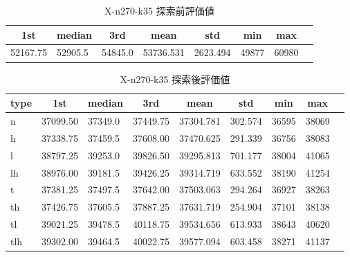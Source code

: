 \begin{table}[htbp]
    \centering
    \caption{X-n270-k35 探索前評価値}
    \begin{tabular}{|l|l|l|l|l|l|l|l|}\hline
    \multicolumn{1}{|c|}{\textbf{1st}}
    &\multicolumn{1}{c|}{\textbf{median}}
    &\multicolumn{1}{c|}{\textbf{3rd}}
    &\multicolumn{1}{c|}{\textbf{mean}}
    &\multicolumn{1}{c|}{\textbf{std}}
    &\multicolumn{1}{c|}{\textbf{min}}
    &\multicolumn{1}{c|}{\textbf{max}}\\\hline
	52167.75 & 52905.5 & 54845.0 & 53736.531 & 2623.494 & 49877 & 60980\\\hline
	\end{tabular}
\end{table}
\begin{table}[htbp]
    \centering
    \caption{X-n270-k35 探索後評価値}
    \begin{tabular}{|l|l|l|l|l|l|l|l|l|}\hline
    \multicolumn{1}{|c|}{\textbf{type}}
    &\multicolumn{1}{|c|}{\textbf{1st}}
    &\multicolumn{1}{c|}{\textbf{median}}
    &\multicolumn{1}{c|}{\textbf{3rd}}
    &\multicolumn{1}{c|}{\textbf{mean}}
    &\multicolumn{1}{c|}{\textbf{std}}
    &\multicolumn{1}{c|}{\textbf{min}}
    &\multicolumn{1}{c|}{\textbf{max}}\\\hline
	n & 37099.50 & 37349.0 & 37449.75 & 37304.781 & 302.574 & 36595 & 38069\\\hline
	h & 37338.75 & 37459.5 & 37608.00 & 37470.625 & 291.339 & 36756 & 38083\\\hline
	l & 38797.25 & 39253.0 & 39826.50 & 39295.813 & 701.177 & 38004 & 41065\\\hline
	lh & 38976.00 & 39181.5 & 39426.25 & 39314.719 & 633.552 & 38190 & 41254\\\hline
	t & 37381.25 & 37497.5 & 37642.00 & 37503.063 & 294.264 & 36927 & 38263\\\hline
	th & 37426.75 & 37605.5 & 37887.25 & 37631.719 & 254.904 & 37101 & 38138\\\hline
	tl & 39021.25 & 39478.5 & 40118.75 & 39534.656 & 613.933 & 38643 & 40620\\\hline
	tlh & 39302.00 & 39464.5 & 40022.75 & 39577.094 & 603.458 & 38271 & 41137\\\hline
	\end{tabular}
\end{table}
